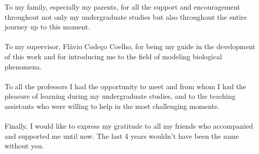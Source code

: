  
\begin{agradecimentos}
    To my family, especially my parents, for all 
    the support and encouragement throughout not 
    only my undergraduate studies but also throughout 
    the entire journey up to this moment.
    \\\\
    To my supervisor, Flávio Codeço Coelho, for being 
    my guide in the development of this work and for 
    introducing me to the field of modeling biological phenomena.
    \\\\
    To all the professors I had the opportunity to 
    meet and from whom I had the pleasure of learning 
    during my undergraduate studies, and to the teaching assistants who were willing to help in the most challenging moments.
    \\\\
    Finally, I would like to express my gratitude to 
    all my friends who accompanied and supported me 
    until now. The last 4 years wouldn't have been the same without you.
\end{agradecimentos}


